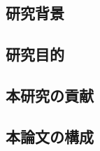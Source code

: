 \chapter{\UsamiIntroductionTitle}

\section{研究背景}

\section{研究目的}

\section{本研究の貢献}

\section{本論文の構成}
